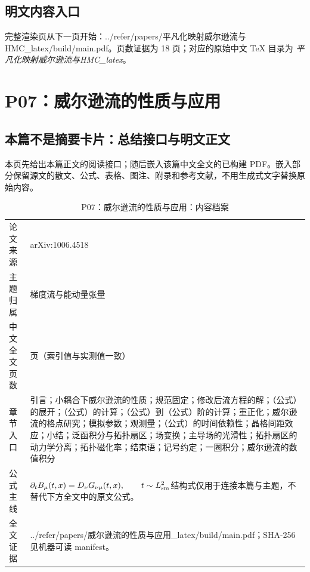 \documentclass[UTF8,11pt,oneside]{ctexbook}
\begin{document}
\section*{明文内容入口}
\noindent 完整渲染页从下一页开始：../\allowbreak{}refer/\allowbreak{}papers/\allowbreak{}平凡化映射威尔逊流与HMC\_\allowbreak{}latex/\allowbreak{}build/\allowbreak{}main.pdf。页数证据为 18 页；对应的原始中文 TeX 目录为 \emph{平凡化映射威尔逊流与HMC\_latex}。
\clearpage

\clearpage

\chapter{P07：威尔逊流的性质与应用}
\section*{本篇不是摘要卡片：总结接口与明文正文}
本页先给出本篇正文的阅读接口；随后嵌入该篇中文全文的已构建 PDF。嵌入部分保留源文的散文、公式、表格、图注、附录和参考文献，不用生成式文字替换原始内容。
\begin{table}[htbp]
  \centering
  \caption{P07：威尔逊流的性质与应用：内容档案}
  \small
  \begin{tabularx}{0.96\textwidth}{@{}p{3.3cm}>{\raggedright\arraybackslash}X@{}}
    \toprule
    论文来源 & arXiv:1006.4518 \\
    主题归属 & 梯度流与能动量张量 \\
    中文全文页数 & 13 页（索引值与实测值一致） \\
    章节入口 & 引言；小耦合下威尔逊流的性质；规范固定；修改后流方程的解；（公式）的展开；（公式）的计算；（公式）到（公式）阶的计算；重正化；威尔逊流的格点研究；模拟参数；观测量；（公式）的时间依赖性；晶格间距效应；小结；泛函积分与拓扑扇区；场变换；主导场的光滑性；拓扑扇区的动力学分离；拓扑磁化率；结束语；记号约定；一圈积分；威尔逊流的数值积分 \\
    公式主线 & $\partial_t B_\mu(t,x)=D_\nu G_{\nu\mu}(t,x),\qquad t\sim L_{\rm sm}^{2}$\newline\scriptsize 结构式仅用于连接本篇与主题，不替代下方全文中的原文公式。 \\
    全文证据 & ../\allowbreak{}refer/\allowbreak{}papers/\allowbreak{}威尔逊流的性质与应用\_\allowbreak{}latex/\allowbreak{}build/\allowbreak{}main.pdf；SHA-256 见机器可读 manifest。 \\
    \bottomrule
  \end{tabularx}
\end{table}
\end{document}
